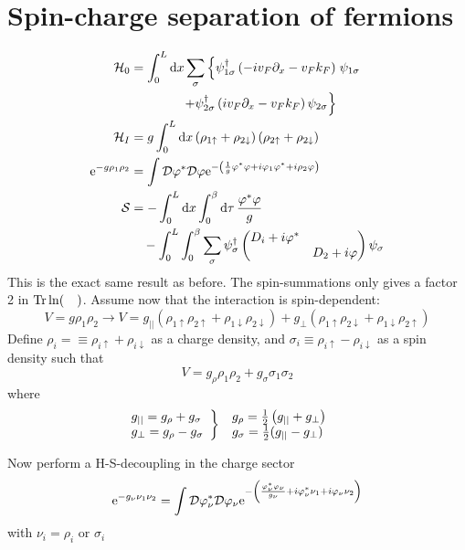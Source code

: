 \section{Spin-charge separation of fermions} %

\begin{align*}
\mathcal{H}_0 &= \int_0^L\dd{x}\sum_\sigma\left\{\psi_{1\sigma}^\dagger\left(-iv_F\partial_x -v_Fk_F\right)\right.\psi_{1\sigma} \\ 
&\qquad\qquad\left.+\psi_{2\sigma}^\dagger\left(iv_F\partial_x -v_Fk_F\right)\psi_{2\sigma}\right\} \\
\mathcal{H}_I &= g\int_0^L\dd{x}\left(\rho_{1\uparrow} +\rho_{2\downarrow} \right)\left(\rho_{2\uparrow}+\rho_{2\downarrow}\right)\\
\mathrm{e}^{-g\rho_1\rho_2}&=\int\mathcal{D}\varphi^*\mathcal{D}\varphi\mathrm{e}^{-\left(\frac1g\varphi^*\varphi + i\varphi_1\varphi^*+i\rho_2\varphi\right)}\\
\mathcal{S} &= -\int_0^L\dd{x}\int_0^\beta\dd{\tau}\frac{\varphi^*\varphi}{g} \\ 
&\quad -\int_0^L\int_0^\beta\sum_\sigma\psi_\sigma^\dagger \begin{pmatrix}
D_i+i\varphi^* & \\
& D_2+i\varphi
\end{pmatrix}\psi_\sigma
\end{align*}
This is the exact same result as before. The spin-summations only gives a factor 2 in \(\Tr\ln(\quad)\). Assume now that the interaction is spin-dependent:
\[V = g\rho_1\rho_2 \rightarrow V= g_{||}(\rho_{1\uparrow}\rho_{2\uparrow}+\rho_{1\downarrow}\rho_{2\downarrow}) + g_\perp(\rho_{1\uparrow}\rho_{2\downarrow}+\rho_{1\downarrow}\rho_{2\uparrow})\]
Define \(\rho_i = \equiv \rho_{i\uparrow}+\rho_{i\downarrow}\) as a charge density, and \(\sigma_i\equiv\rho_{i\uparrow}-\rho_{i\downarrow}\) as a spin density such that \[V = g_\rho\rho_1\rho_2 +g_\sigma\sigma_1\sigma_2\]
where
\begin{align*}
\left.\begin{array}{@{}l}
g_{||} = g_\rho + g_\sigma \\
g_\perp = g_\rho-g_\sigma
\end{array}\right\} &\quad
\begin{array}{@{}l}
g_\rho = \frac12\left(g_{||}+g_\perp\right) \\
g_\sigma=\frac12 (g_{||}-g_\perp)
\end{array}
\end{align*}

Now perform a H-S-decoupling in the charge sector
\begin{equation}
\mathrm{e}^{-g_\nu\nu_1\nu_2} = \int\mathcal{D}\varphi_\nu^* \mathcal{D}\varphi_\nu\mathrm{e}^{-\left(\frac{\varphi_\nu^* \varphi_\nu}{g_\nu}+i\varphi_\nu^* \nu_1+i\varphi_\nu\nu_2\right)}
\end{equation}
with \(\nu_i = \rho_i \text{ or } \sigma_i\)